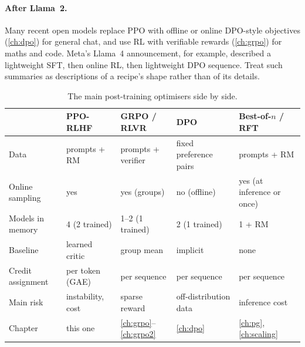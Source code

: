 \paragraph{After Llama~2.} Many recent open models replace PPO with offline or online DPO-style
objectives (\cref{ch:dpo}) for general chat, and use RL with verifiable rewards (\cref{ch:grpo}) for
maths and code. Meta's Llama~4 announcement, for example, described a lightweight SFT, then online RL, then lightweight DPO
sequence. Treat such summaries as descriptions of a recipe's shape rather than of its details.

\begin{table}[ht]
\centering\small
\begin{tabularx}{\linewidth}{@{}lXXXX@{}}
\toprule
& \textbf{PPO-RLHF} & \textbf{GRPO / RLVR} & \textbf{DPO} & \textbf{Best-of-$n$ / RFT}\\
\midrule
Data & prompts + RM & prompts + verifier & fixed preference pairs & prompts + RM\\
Online sampling & yes & yes (groups) & no (offline) & yes (at inference or once)\\
Models in memory & 4 (2 trained) & 1--2 (1 trained) & 2 (1 trained) & 1 + RM\\
Baseline & learned critic & group mean & implicit & none\\
Credit assignment & per token (GAE) & per sequence & per sequence & per sequence\\
Main risk & instability, cost & sparse reward & off-distribution data & inference cost\\
Chapter & this one & \ref{ch:grpo}--\ref{ch:grpo2} & \ref{ch:dpo} & \ref{ch:pg}, \ref{ch:scaling}\\
\bottomrule
\end{tabularx}
\caption{The main post-training optimisers side by side.}
\label{tab:rlhf:compare}
\end{table}

